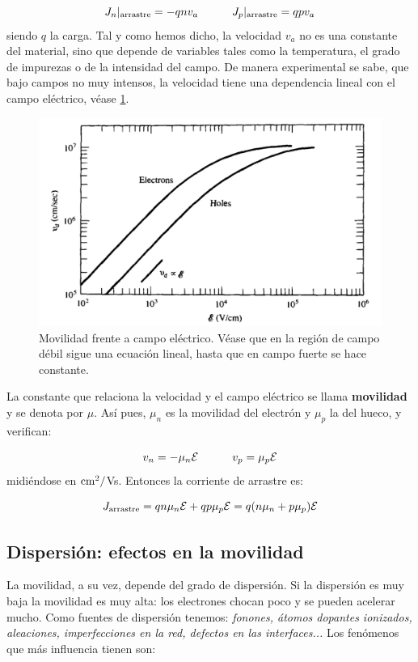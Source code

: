 \begin{equation}
	J_n|_{\text{arrastre}} = -qnv_a \quad \quad \quad 	J_p|_{\text{arrastre}} = qpv_a
\end{equation}
siendo $q$ la carga. Tal y como hemos dicho, la velocidad $v_a$ no es una constante del material, sino que depende de variables tales como la temperatura, el grado de impurezas o de la intensidad del campo. De manera experimental se sabe, que bajo campos no muy intensos, la velocidad tiene una dependencia lineal con el campo eléctrico, véase \cref{Fig:02-01}. 

\begin{figure}[h!] \centering
	\includegraphics[width=0.9\linewidth]{Cuerpo/Ch_02/02_Movilidad_E.png}
	\caption{Movilidad frente a campo eléctrico. Véase que en la región de campo débil sigue una ecuación lineal, hasta que en campo fuerte se hace constante.}
	\label{Fig:02-01}
\end{figure}
La constante que relaciona la velocidad y el campo eléctrico se llama \textbf{movilidad} y se denota por $\mu$. Así pues, $\mu_n$ es la movilidad del electrón y $\mu_p$ la del hueco, y verifican:

\begin{equation}
	v_n = - \mu_n \mathcal{E} \quad \quad \quad v_p = \mu_p \mathcal{E}
\end{equation}
midiéndose en $\text{cm}^2/$Vs. Entonces la corriente de arrastre es:

\begin{equation}
	J_{\text{arrastre}} = qn\mu_n \mathcal{E} + qp\mu_p \mathcal{E} = q(n\mu_n+p\mu_p)\mathcal{E}
\end{equation}
\subsection{Dispersión: efectos en la movilidad}

La movilidad, a su vez, depende del grado de dispersión. Si la dispersión es muy baja la movilidad es muy alta: los electrones chocan poco y se pueden acelerar mucho. Como fuentes de dispersión tenemos: \textit{fonones, átomos dopantes ionizados, aleaciones, imperfecciones en la red, defectos en las interfaces...} Los fenómenos que más influencia tienen son:

